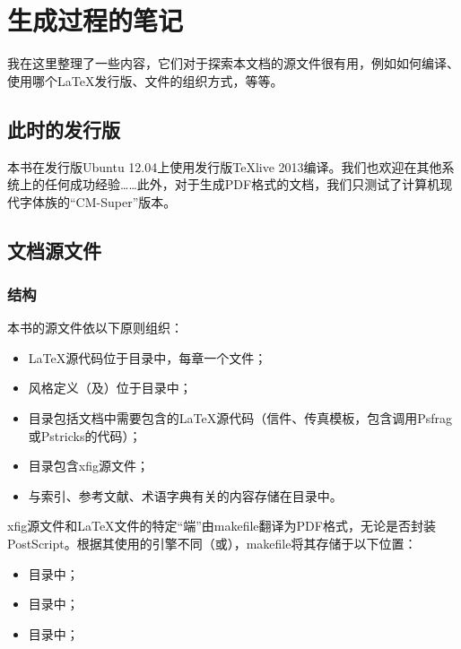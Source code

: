 \chapter{生成过程的笔记}

我在这里整理了一些内容，它们对于探索本文档的源文件很有用，例如如何编译、使用哪个\LaTeX 发行版、文件的组织方式，等等。

\section{此时的发行版}

本书在发行版Ubuntu 12.04上使用发行版\TeX live 2013编译。我们也欢迎在其他系统上的任何成功经验……此外，对于生成PDF格式的文档，我们只测试了计算机现代字体族的``CM-Super''版本。

\section{文档源文件}

\subsection{结构}

本书的源文件依以下原则组织：

\begin{itemize}
    \item \LaTeX 源代码位于目录中，每章一个文件；
    \item 风格定义（及）位于目录中；
    \item 目录包括文档中需要包含的\LaTeX 源代码（信件、传真模板，包含调用Psfrag或Pstricks的代码）；%
    \item 目录包含\textsf{xfig}源文件；
    \item 与索引、参考文献、术语字典有关的内容存储在目录中。
\end{itemize}

\textsf{xfig}源文件和\LaTeX 文件的特定``端''由makefile翻译为PDF格式，无论是否封装PostScript。根据其使用的引擎不同（或），makefile将其存储于以下位置：

\begin{itemize}
    \item 目录中；
    \item 目录中；
    \item 目录中；
\end{itemize}

